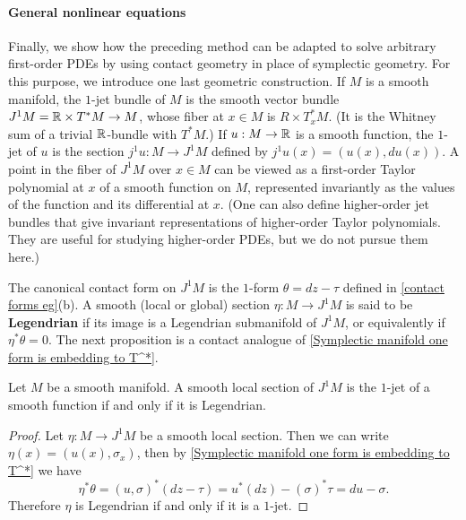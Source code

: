 \paragraph{General nonlinear equations}
Finally, we show how the preceding method can be adapted to solve arbitrary first-order PDEs by using contact geometry in place of symplectic geometry. For this purpose, we introduce one last geometric construction. If $M$ is a smooth manifold, the $1$-jet bundle of $M$ is the smooth vector bundle $J^1M=\mathbb{R}\times T^*M\to M$, whose fiber at $x\in M$ is $R\times T_x^*M$. (It is the Whitney sum of a trivial $\mathbb{R}$-bundle with $T^*M$.) If $u:M\to\mathbb{R}$ is a smooth function, the $1$-jet of $u$ is the section $j^1u:M\to J^1M$ defined by $j^1u(x)=(u(x),du(x))$. A point in the fiber of $J^1M$ over $x\in M$ can be viewed as a first-order Taylor polynomial at $x$ of a smooth function on $M$, represented invariantly as the values of the function and its differential at $x$. (One can also define higher-order jet bundles that give invariant representations of higher-order Taylor polynomials. They are useful for studying higher-order PDEs, but we do not pursue them here.)\par
The canonical contact form on $J^1M$ is the $1$-form $\theta=dz-\tau$ defined in \cref{contact forms eg}(b). A smooth (local or global) section $\eta:M\to J^1M$ is said to be \textbf{Legendrian} if its image is a Legendrian submanifold of $J^1M$, or equivalently if $\eta^*\theta=0$. The next proposition is a contact analogue of \cref{Symplectic manifold one form is embedding to T^*}.

\begin{proposition}
Let $M$ be a smooth manifold. A smooth local section of $J^1M$ is the $1$-jet of a smooth function if and only if it is Legendrian.
\end{proposition}
\begin{proof}
Let $\eta:M\to J^1M$ be a smooth local section. Then we can write $\eta(x)=(u(x),\sigma_x)$, then by \cref{Symplectic manifold one form is embedding to T^*} we have
\[\eta^*\theta=(u,\sigma)^*(dz-\tau)=u^*(dz)-(\sigma)^*\tau=du-\sigma.\]
Therefore $\eta$ is Legendrian if and only if it is a $1$-jet.
\end{proof}

